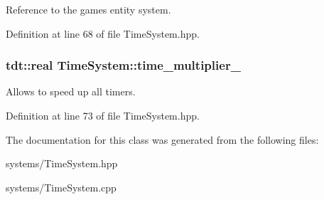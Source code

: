 Reference to the game\textquotesingle{}s entity system. 



Definition at line 68 of file Time\+System.\+hpp.

\subsubsection[{\texorpdfstring{time\+\_\+multiplier\+\_\+}{time_multiplier_}}]{\setlength{\rightskip}{0pt plus 5cm}tdt\+::real Time\+System\+::time\+\_\+multiplier\+\_\+\hspace{0.3cm}{\ttfamily [private]}}\hypertarget{class_time_system_a4477b8cfae0717af23decf2e90359dad}{}\label{class_time_system_a4477b8cfae0717af23decf2e90359dad}


Allows to speed up all timers. 



Definition at line 73 of file Time\+System.\+hpp.



The documentation for this class was generated from the following files\+:\begin{DoxyCompactItemize}
\item 
systems/Time\+System.\+hpp\item 
systems/Time\+System.\+cpp\end{DoxyCompactItemize}
